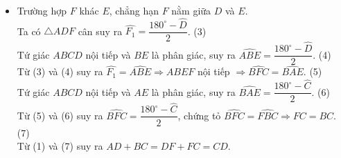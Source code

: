 \begin{bt}
{\begin{itemize}
	\begin{center}
		a) \hspace{7cm} b)\\
		\textit{Hình $350$}
	\end{center}
	\item Trường hợp $F$ khác $E$, chẳng hạn $F$ nằm giữa $D$ và $E$.\\ 
	Ta có $\triangle ADF$ cân suy ra $\widehat{F_1}=\dfrac{180^\circ - \widehat{D}}{2}$. \hfill(3)\\
	Tứ giác $ABCD$ nội tiếp và $BE$ là phân giác, suy ra $\widehat{ABE}=\dfrac{180^\circ - \widehat{D}}{2}$. \hfill (4)\\
	Từ (3) và (4) suy ra $\widehat{F_1}=\widehat{ABE}\Rightarrow ABEF$ nội tiếp $\Rightarrow \widehat{BFC}=\widehat{BAE}$. \hfill (5)\\
	Tứ giác $ABCD$ nội tiếp và $AE$ là phân giác, suy ra $\widehat{BAE}=\dfrac{180^\circ - \widehat{C}}{2}$. \hfill (6)\\
	Từ (5) và (6) suy ra $\widehat{BFC}=\dfrac{180^\circ - \widehat{C}}{2}$, chứng tỏ $\widehat{BFC}=\widehat{FBC}\Rightarrow FC = BC$. \hfill (7)\\
	Từ (1) và (7) suy ra $AD+BC=DF+FC=CD$.
   \end{itemize}
  }
\end{bt}

